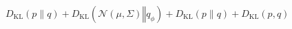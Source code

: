\newcommand{\KL}[2]{D_{\mathrm{KL}}(#1 \| #2)}
$D_{\mathrm{KL}}(p \| q) + D_\mathrm{KL}(\mathcal{N}(μ, Σ) ‖ q_ϕ) + \KL{p}{q} + D_{\mathrm{KL}}(p, q)$
